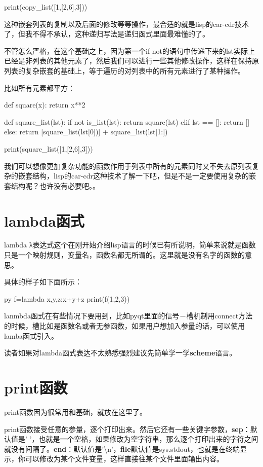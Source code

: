 \documentclass[12pt,oneside]{book}
\begin{document}
\begin{common-format}
\begin{tcbpython}[]
print(copy_list([1,[2,6],3]))
\end{tcbpython}


这种嵌套列表的复制以及后面的修改等等操作，最合适的就是lisp的car-cdr技术了，但我不得不承认，这种递归写法是递归函式里面最难懂的了。

不管怎么严格，在这个基础之上，因为第一个if not的语句中传递下来的lst实际上已经是非列表的其他元素了，然后我们可以进行一些其他修改操作，这样在保持原列表的复杂嵌套的基础上，等于遍历的对列表中的所有元素进行了某种操作。

比如所有元素都平方：
\begin{tcbpython}[]
def square(x):
    return x**2

def square_list(lst):
    if  not  is_list(lst):
        return square(lst)
    elif lst == []:
        return []
    else:
        return [square_list(lst[0])] + square_list(lst[1:])

print(square_list([1,[2,6],3]))
\end{tcbpython}

我们可以想像更加复杂功能的函数作用于列表中所有的元素同时又不失去原列表复杂的嵌套结构，lisp的car-cdr这种技术了解一下吧，但是不是一定要使用复杂的嵌套结构呢？也许没有必要吧。。


\section{lambda函式}
lambda
λ表达式这个在刚开始介绍lisp语言的时候已有所说明，简单来说就是函数只是一个映射规则，变量名，函数名都无所谓的。这里就是没有名字的函数的意思。

具体的样子如下面所示：
\begin{xverbatim}[129]{py}
f=lambda x,y,z:x+y+z
print(f(1,2,3))
\end{xverbatim}

lanmbda函式在有些情况下要用到，比如pyqt里面的信号－槽机制用connect方法的时候，槽比如是函数名或者无参函数，如果用户想加入参量的话，可以使用lamba函式引入。

读者如果对lambda函式表达不太熟悉强烈建议先简单学一学\textbf{scheme}语言。

\section{print函数}
print函数因为很常用和基础，就放在这里了。

print函数接受任意的参量，逐个打印出来。然后它还有一些关键字参数，\textbf{sep}：默认值是' '，也就是一个空格，如果修改为空字符串，那么逐个打印出来的字符之间就没有间隔了。\textbf{end}：默认值是'\textbackslash{}n'，\textbf{file}默认值是sys.stdout，也就是在终端显示，你可以修改为某个文件变量，这样直接往某个文件里面输出内容。






\end{common-format}
\end{document}
